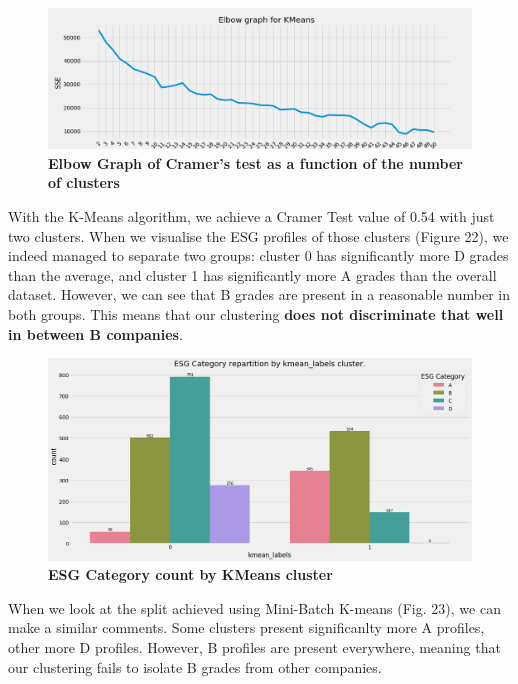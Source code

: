 \documentclass[12pt]{report}
\begin{document}
\begin{figure}[h!]
\centering
\includegraphics[scale=0.3]{elbow_graph_kmeans.png}
\caption{\textbf{Elbow Graph of Cramer's test as a function of the number of clusters}}
\label{fig:kmeans_elbow}
\end{figure}

With the K-Means algorithm, we achieve a Cramer Test value of 0.54 with just two clusters. When we visualise the ESG profiles of those clusters (Figure 22), we indeed managed to separate two groups: cluster 0 has significantly more D grades than the average, and cluster 1 has significantly more A grades than the overall dataset. However, we can see that B grades are present in a reasonable number in both groups. This means that our clustering \textbf{does not discriminate that well in between B companies}. 

\begin{figure}[h!]
\centering
\includegraphics[scale=0.3]{ESG_cat_kmeans.png}
\caption{\textbf{ESG Category count by KMeans cluster}}
\label{fig:kmeans_esg}
\end{figure}

When we look at the split achieved using Mini-Batch K-means (Fig. 23), we can make a similar comments. Some clusters present significanlty more A profiles, other more D profiles. However, B profiles are present everywhere, meaning that our clustering fails to isolate B grades from other companies.
\end{document}
